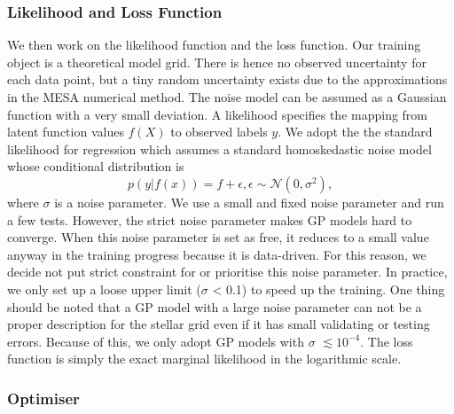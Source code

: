 \subsubsection{Likelihood and Loss Function}

We then work on the likelihood function and the loss function. Our training object is a theoretical model grid. There is hence no observed uncertainty for each data point, but a tiny random uncertainty exists due to the approximations in the \textsc{MESA} numerical method. The noise model can be assumed as a Gaussian function with a very small deviation. 
%   
A likelihood specifies the mapping from latent function values $f(X)$ to observed labels $y$.
We adopt the the standard likelihood for regression which assumes a standard homoskedastic noise model whose conditional distribution is
\begin{equation}\label{eq:likelihood}
p(y|f(x)) = f + \epsilon, \epsilon \sim \mathcal{N}(0, \sigma^{2}),
\end{equation}
where $\sigma$ is a noise parameter. 
%
We use a small and fixed noise parameter and run a few tests. However, the strict noise parameter makes GP models hard to converge. When this noise parameter is set as free, it reduces to a small value anyway in the training progress because it is data-driven. For this reason, we decide not put strict constraint for or prioritise this noise parameter. In practice, we only set up a loose upper limit ($\sigma$  < 0.1) to speed up the training. One thing should be noted that a GP model with a large noise parameter can not be a proper description for the stellar grid even if it has small validating or testing errors. Because of this, we only adopt GP models with $\sigma$ $\lesssim 10^{-4}$.   
The loss function is simply the exact marginal likelihood in the logarithmic scale.

\subsubsection{Optimiser}

